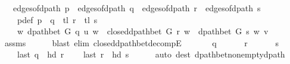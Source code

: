 \begin{isabellebody}
\ \ \ {\isachardoublequoteopen}edges{\isacharunderscore}{\kern0pt}of{\isacharunderscore}{\kern0pt}dpath\ p\ {\isacharequal}{\kern0pt}\ edges{\isacharunderscore}{\kern0pt}of{\isacharunderscore}{\kern0pt}dpath\ q\ {\isacharat}{\kern0pt}\ edges{\isacharunderscore}{\kern0pt}of{\isacharunderscore}{\kern0pt}dpath\ r\ {\isacharat}{\kern0pt}\ edges{\isacharunderscore}{\kern0pt}of{\isacharunderscore}{\kern0pt}dpath\ s{\isachardoublequoteclose}%
\endisataginvisible
{\isafoldinvisible}%
%
\isadeliminvisible
\isanewline
%
\endisadeliminvisible
%
\isadelimproof
%
\endisadelimproof
%
\isatagproof
{}\isamarkupfalse%
\ {\isacharminus}{\kern0pt}\isanewline
\ \ \isamarkupfalse%
\isanewline
\ \ \ \ p{\isacharunderscore}{\kern0pt}def{\isacharcolon}{\kern0pt}\ {\isachardoublequoteopen}p\ {\isacharequal}{\kern0pt}\ q\ {\isacharat}{\kern0pt}\ tl\ r\ {\isacharat}{\kern0pt}\ tl\ s{\isachardoublequoteclose}\ \isanewline
\ \ \ \ {\isachardoublequoteopen}{\isasymexists}w{\isachardot}{\kern0pt}\ dpath{\isacharunderscore}{\kern0pt}bet\ G\ q\ u\ w\ {\isasymand}\ closed{\isacharunderscore}{\kern0pt}dpath{\isacharunderscore}{\kern0pt}bet\ G\ r\ w\ {\isasymand}\ dpath{\isacharunderscore}{\kern0pt}bet\ G\ s\ w\ v{\isachardoublequoteclose}\isanewline
\ \ \ \ \isamarkupfalse%
\ assms\isanewline
\ \ \ \ \isamarkupfalse%
\ {\isacharparenleft}{\kern0pt}blast\ elim{\isacharcolon}{\kern0pt}\ closed{\isacharunderscore}{\kern0pt}dpath{\isacharunderscore}{\kern0pt}bet{\isacharunderscore}{\kern0pt}decompE{\isacharunderscore}{\kern0pt}{}{\isacharparenright}{\kern0pt}{\isacharplus}{\kern0pt}\isanewline
\ \ \isamarkupfalse%
\isanewline
\ \ \ \ {\isachardoublequoteopen}q\ {\isasymnoteq}\ {\isacharbrackleft}{\kern0pt}{\isacharbrackright}{\kern0pt}{\isachardoublequoteclose}\isanewline
\ \ \ \ {\isachardoublequoteopen}r\ {\isasymnoteq}\ {\isacharbrackleft}{\kern0pt}{\isacharbrackright}{\kern0pt}{\isachardoublequoteclose}\isanewline
\ \ \ \ {\isachardoublequoteopen}s\ {\isasymnoteq}\ {\isacharbrackleft}{\kern0pt}{\isacharbrackright}{\kern0pt}{\isachardoublequoteclose}\isanewline
\ \ \ \ {\isachardoublequoteopen}last\ q\ {\isacharequal}{\kern0pt}\ hd\ r{\isachardoublequoteclose}\isanewline
\ \ \ \ {\isachardoublequoteopen}last\ r\ {\isacharequal}{\kern0pt}\ hd\ s{\isachardoublequoteclose}\isanewline
\ \ \ \ \isamarkupfalse%
\ {\isacharparenleft}{\kern0pt}auto\ dest{\isacharcolon}{\kern0pt}\ dpath{\isacharunderscore}{\kern0pt}bet{\isacharunderscore}{\kern0pt}nonempty{\isacharunderscore}{\kern0pt}dpath{\isacharparenleft}{\kern0pt}{}{\isacharminus}{\kern0pt}{}{\isacharparenright}{\kern0pt}{\isacharparenright}{\kern0pt}\isanewline

\end{isabellebody}
